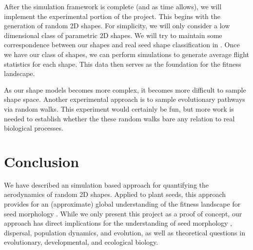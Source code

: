 \documentclass[annual]{acmsiggraph}
\begin{document}
After the simulation framework is complete (and as time allows), we will implement the experimental portion of the project.  This begins with the generation of random 2D shapes.  For simplicity, we will only consider a low dimensional class of parametric  2D shapes.   We will try to maintain some correspondence between our shapes and real seed shape classification in \cite{augspurger1986}.   Once we have our class of shapes, we can perform simulations to generate average flight statistics for each shape.  This data then serves as the foundation for the fitness landscape. 

As our shape models becomes more complex, it becomes more difficult to sample shape space.  Another experimental approach is to sample evolutionary pathways via random walks.   This experiment would certainly be fun, but more work is needed to establish  whether the these random walks bare any relation to real biological processes.  


\section{Conclusion}
We have described an simulation based approach  for quantifying the aerodynamics of random 2D shapes.  Applied to plant seeds, this approach provides for an (approximate) global understanding of the fitness landscape for seed morphology .  While we only present this project as a proof of concept, our approach has direct implications for the understanding of seed morphology , dispersal, population dynamics, and evolution,  as well as theoretical questions in evolutionary, developmental, and ecological biology.  




\end{document}
